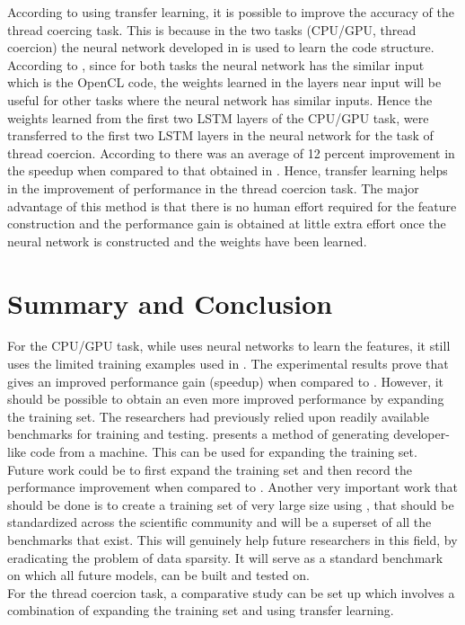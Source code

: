 \documentclass[a4paper,11pt]{article}
\begin{document}
  \indent According to \cite{first} using transfer learning, it is possible to improve the accuracy of the thread coercing task. This is because in the two tasks (CPU/GPU, thread coercion) the neural network developed in \cite{first} is used to learn the code structure. According to \cite{first}, since for both tasks the neural network has the similar input which is the OpenCL code, the weights learned in the layers near input will be useful for other tasks where the neural network has similar inputs. Hence the weights learned from the first two LSTM layers of the CPU/GPU task, were transferred to the first two LSTM layers in the neural network for the task of thread coercion. According to \cite{first} there was an average of 12 percent improvement in the speedup when compared to that obtained in \cite{threadautomatic}. Hence, transfer learning helps in the improvement of performance in the thread coercion task.
 The major advantage of this method is that there is no human effort required for the feature construction and the performance gain is obtained at little extra effort once the neural network is constructed and the weights have been learned.
  
  \section{Summary and Conclusion}
\indent \indent For the CPU/GPU task, while \cite{first} uses neural networks to learn the features, it still uses the limited training examples used in \cite{second}. The experimental results prove that \cite{first} gives an improved performance gain (speedup) when compared to \cite{second}. However, it should be possible to obtain an even more improved performance  by expanding the training set. The researchers had previously relied upon readily available benchmarks for training and testing. \cite{sixth} presents a method of generating developer-like code from a machine. This can be used for expanding the training set.\\
   \indent Future work could be to first expand the training set and then record the performance improvement when compared to \cite{second}. Another very important work that should be done is to create a training set of very large size using \cite{sixth}, that should be standardized across the scientific community and will be a superset of all the benchmarks that exist. This will genuinely help future researchers in this field, by  eradicating the problem of data sparsity. It will serve as a standard benchmark on which all future models, can be built and tested on. \\ \indent For the thread coercion task, a comparative study can be set up which involves a combination of expanding the training set and using transfer learning.
    





\end{document}
